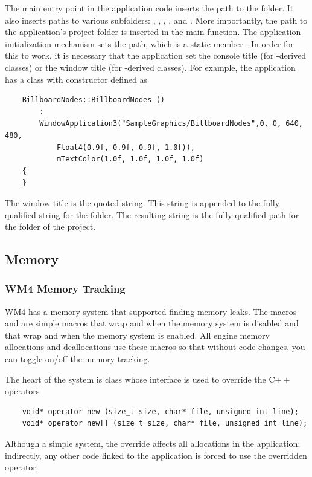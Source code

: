 \documentclass{article}
\begin{document}
The main entry point in the application code inserts the path to
the  folder.  It also inserts paths to various
 subfolders: , ,
, , and .  More importantly, the
path to the application's project folder is inserted in the
main function.  The application initialization mechanism sets the
path, which is a static member .  In
order for this to work, it is necessary that the application
set the console title (for -derived
classes) or the window title (for -derived
classes).  For example, the application 
has a class with constructor defined as
\begin{verbatim}
    BillboardNodes::BillboardNodes ()
        :
        WindowApplication3("SampleGraphics/BillboardNodes",0, 0, 640, 480,
            Float4(0.9f, 0.9f, 0.9f, 1.0f)),
            mTextColor(1.0f, 1.0f, 1.0f, 1.0f)
    {
    }
\end{verbatim}
The window title is the quoted string.  This string is appended to
the fully qualified string for the  folder.  The
resulting string is the fully qualified path for the folder of the
 project.

\subsection{Memory}

\subsubsection{WM4 Memory Tracking}

WM4 has a memory system that supported finding memory leaks.  The macros
 and  are simple macros that wrap
 and  when the memory system is disabled and
that wrap  and  when the
memory system is enabled.  All engine memory allocations and
deallocations use these macros so that without code changes, you can
toggle on/off the memory tracking.

The heart of the system is class  whose interface is used
to override the C$++$ operators
\begin{verbatim}
    void* operator new (size_t size, char* file, unsigned int line);
    void* operator new[] (size_t size, char* file, unsigned int line);
\end{verbatim}
Although a simple system, the override affects all allocations in the
application; indirectly, any other code linked to the application is
forced to use the overridden operator.
\end{document}
